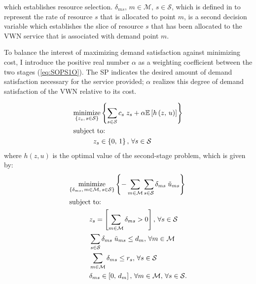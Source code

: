 \documentclass[12pt,dvipsnames]{report}
\begin{document}
which establishes resource selection.  $\delta_{ms},\, m \in \mathcal{M},\, s \in \mathcal{S}$, which is defined in  to represent the rate of resource $s$ that is allocated to point $m$, is a second decision variable which establishes the slice of resource $s$ that has been allocated to the VWN service that is associated with demand point $m$.

To balance the interest of maximizing demand satisfaction against minimizing cost, I introduce the positive real number $\alpha$ as a weighting coefficient between the two stages (\cref{eq:SOPS1O}).  The SP indicates the desired amount of demand satisfaction necessary for the service provided; $\alpha$ realizes this degree of demand satisfaction of the VWN relative to its cost.

\begin{tcolorbox}[floatplacement = !ht, float, title = Two-Stage Stochastic Optimization Program for BS Selection and Adaptive Slicing]
\begin{align}
& \underset{\left\{z_s,\, s \in \mathcal{S}\right\}}{\text{minimize}} \left\{ \sum_{s \in \mathcal{S}} c_s \; z_s + \alpha \mathbb{E}\left[ h\left( z,\, u \right) \right] \right\} \label{eq:SOPS1O}\\
& \text{subject to:}  \nonumber \\
& \hspace{0.4in} z_s \in \left\{ 0,\, 1 \right\},\, \forall s \in \mathcal{S} \label{eq:SOPS1C1}
\end{align}
where $h(z, u)$ is the optimal value of the second-stage problem, which is given by:
\begin{align}
& \underset{\left\{ \substack{\delta_{ms},\, m \in \mathcal{M},\, s \in \mathcal{S}} \right\}}{\mathrm{minimize}} \left\{ - \sum_{m \in \mathcal{M}} \sum_{s \in \mathcal{S}} \delta_{ms} \; \tilde{u}_{ms} \right\} \label{eq:SOPS2O}\\
& \text{subject to:}  \nonumber \\
& \hspace{0.4in} z_s = \left[ \sum_{m \in \mathcal{M}} \delta_{ms} > 0 \right],\, \forall s \in \mathcal{S} \label{eq:SOPS2C1}\\
& \hspace{0.4in} \sum_{s \in \mathcal{S}} \delta_{ms} \; \tilde{u}_{ms} \leq d_m,\, \forall m \in \mathcal{M} \label{eq:SOPS2C2}\\
& \hspace{0.4in} \sum_{m \in \mathcal{M}} \delta_{ms} \leq r_s,\, \forall s \in \mathcal{S} \label{eq:SOPS2C3}\\
& \hspace{0.4in} \delta_{ms} \in \left[ 0,\, d_m \right],\, \forall m \in \mathcal{M},\, \forall s \in \mathcal{S}. \label{eq:SOPS2C4}
\end{align}
\end{tcolorbox}
\end{document}
